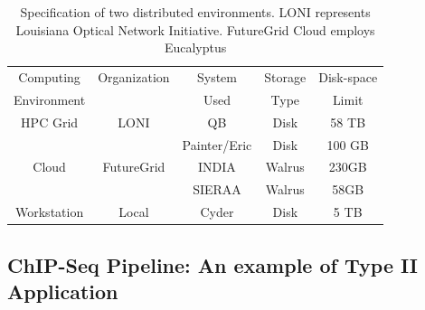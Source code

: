 \documentclass{cpeauth}
\begin{document}
\begin{table}
\small
\begin{tabular}{|c|c|c|c|c|} 
\hline 
Computing & Organization & System &  Storage & Disk-space  \\
Environment & & Used & Type  &  Limit \\ \hline
HPC Grid & LONI & QB & Disk & 58 TB   \\
 &  &  Painter/Eric  & Disk &  100 GB  \\
Cloud & FutureGrid & INDIA & Walrus & 230GB \\
         &                    &  SIERAA & Walrus & 58GB \\ 
Workstation &  Local   &  Cyder & Disk       & 5 TB\\

 \hline


 \end{tabular}
\caption{Specification of two distributed environments. LONI represents Louisiana Optical Network Initiative\cite{loni}. FutureGrid Cloud\cite{futuregrid} employs Eucalyptus}
\label{table:two-systems} 
\end{table}




\subsection{ChIP-Seq Pipeline: An example of Type II Application}
\end{document}
